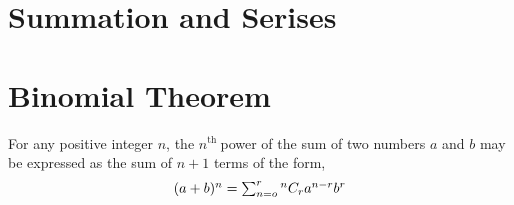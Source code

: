\section{Summation and Serises}
\begin{minipage}{0.45\textwidth}
	\begin{center}
	\end{center}
\end{minipage}
\begin{minipage}{0.45\textwidth}
	\begin{center}
	\end{center}
\end{minipage}
\section{Binomial Theorem}
\begin{theorem}
	For any positive integer $ n $, the $ n ^{\text{th }}$power of the sum of two numbers $ a $ and $ b $ may be expressed as the sum of $ n + 1 $ terms of the form,
\begin{equation}
		$$(a+b)^{n}= \sum_{n=o}^{r} {^{n}C_{r} a^{n-r}b^{r}}$$
\end{equation}

\end{theorem}
